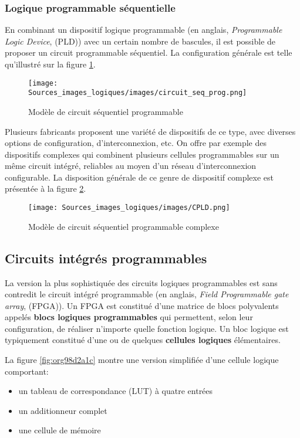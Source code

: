 \documentclass[11pt]{article}
\begin{document}
\subsubsection{Logique programmable séquentielle}
\label{sec:org102b92b}

En combinant un dispositif logique programmable (en anglais,
\emph{Programmable Logic Device}, (PLD)) avec un certain nombre de
bascules, il est possible de proposer un circuit programmable
séquentiel. La configuration générale est telle qu'illustré sur la
figure \ref{fig:org12ee02a}.


\begin{figure}[htbp]
\centering
\texttt{[image: Sources\_images\_logiques/images/circuit\_seq\_prog.png]}
\caption{\label{fig:org12ee02a}Modèle de circuit séquentiel programmable}
\end{figure} 

Plusieurs fabricants proposent une variété de dispositifs de ce type,
avec diverses options de configuration, d'interconnexion, etc.  On
offre par exemple des dispositifs complexes qui combinent plusieurs
cellules programmables sur un même circuit intégré, reliables au moyen
d'un réseau d'interconnexion configurable. La disposition générale de
ce genre de dispositif complexe est présentée à la figure \ref{fig:org88565fe}.

\begin{figure}[htbp]
\centering
\texttt{[image: Sources\_images\_logiques/images/CPLD.png]}
\caption{\label{fig:org88565fe}Modèle de circuit séquentiel programmable complexe}
\end{figure}

\subsection{Circuits intégrés programmables}
\label{sec:org5c6ed4c}

La version la plus sophistiquée des circuits logiques programmables
est sans contredit le circuit intégré programmable (en anglais, \emph{Field
Programmable gate array}, (FPGA)). Un FPGA est constitué d'une matrice
de blocs polyvalents appelés \textbf{blocs logiques programmables} qui
permettent, selon leur configuration, de réaliser n'importe quelle
fonction logique. Un bloc logique est typiquement constitué d'une ou
de quelques \textbf{cellules logiques} élémentaires.

La figure \ref{fig:org98d2a1c} montre une version simplifiée d'une cellule
logique comportant:
\begin{itemize}
\item un tableau de correspondance (LUT) à quatre entrées
\item un additionneur complet
\item une cellule de mémoire
\end{itemize}
\end{document}
